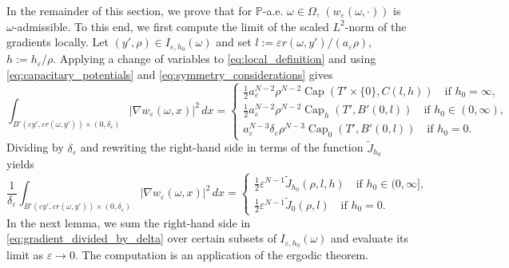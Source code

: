\documentclass{article}
\numberwithin{equation}{section}
\theoremstyle{definition}
\theoremstyle{remark}
\newcommand{\cpct}{\operatorname{Cap}}
\begin{document}
In the remainder of this section, we prove that for $\mathbb{P}$-a.e. $\omega \in \Omega$, $(w_\varepsilon(\omega, \cdot))$ is $\omega$-admissible. To this end, we first compute the limit of the scaled $L^2$-norm of the gradients locally. Let $(y', \rho) \in I_{\varepsilon, h_0}(\omega)$ and set $l := \varepsilon r(\omega, y')/(a_\varepsilon \rho)$, $h := h_\varepsilon/\rho$. Applying a change of variables to \eqref{eq:local_definition} and using \eqref{eq:capacitary_potentials} and \eqref{eq:symmetry_considerations} gives
\begin{equation*}
    \int_{B'(\varepsilon y', \varepsilon r(\omega, y')) \times (0, \delta_\varepsilon)} |\nabla w_\varepsilon(\omega, x)|^2 \, dx = 
    \begin{cases}
        \frac{1}{2} a_\varepsilon^{N - 2} \rho^{N - 2} \cpct(T' \times \{0\}, C(l, h)) \quad \text{if } h_0 = \infty, \\
        \frac{1}{2} a_\varepsilon^{N - 2} \rho^{N - 2} \cpct_h(T', B'(0, l)) \quad \text{if } h_0 \in (0, \infty), \\
        a_\varepsilon^{N - 3} \delta_\varepsilon \rho^{N - 3} \cpct_0(T', B'(0, l)) \quad \text{if } h_0 = 0.
    \end{cases}
\end{equation*}
Dividing by $\delta_\varepsilon$ and rewriting the right-hand side in terms of the function $\tilde{J}_{h_0}$ yields
\begin{equation} \label{eq:gradient_divided_by_delta}
    \frac{1}{\delta_\varepsilon} \int_{B'(\varepsilon y', \varepsilon r(\omega, y')) \times (0, \delta_\varepsilon)} |\nabla w_\varepsilon(\omega, x)|^2 \, dx = 
    \begin{cases}
        \frac{1}{2} \varepsilon^{N - 1} \tilde{J}_{h_0}(\rho, l, h) \quad \text{if } h_0 \in (0, \infty], \\
        \frac{1}{2} \varepsilon^{N - 1} \tilde{J}_0(\rho, l) \quad \text{if } h_0 = 0.
    \end{cases}
\end{equation}
In the next lemma, we sum the right-hand side in \eqref{eq:gradient_divided_by_delta} over certain subsets of $I_{\varepsilon, h_0}(\omega)$ and evaluate its limit as $\varepsilon \to 0$. The computation is an application of the ergodic theorem.
\end{document}
